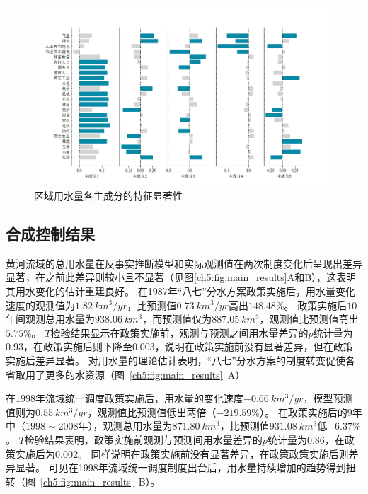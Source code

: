 \begin{figure}[htb]
    \centering
    \includegraphics[width=\textwidth]{img/ch5/ch5_variables.png}
    \caption{区域用水量各主成分的特征显著性}\label{ch5:fig:variables}
\end{figure}

\subsection{合成控制结果}\label{result-2}

黄河流域的总用水量在反事实推断模型和实际观测值在两次制度变化后呈现出差异显著，在之前此差异则较小且不显著（见图\ref{ch5:fig:main_results}A和B），这表明其用水变化的估计重建良好。
在1987年“八七”分水方案政策实施后，用水量变化速度的观测值为$1.82~km^3/yr$，比预测值$0.73~km^3/yr$高出$148.48\%$。
政策实施后$10$年间观测总用水量为$938.06~km^3$，而预测值仅为$887.05~km^3$，观测值比预测值高出$5.75\%$。
$T$检验结果显示在政策实施前，观测与预测之间用水量差异的$p$统计量为$0.93$，在政策实施后则下降至$0.003$，说明在政策实施前没有显著差异，但在政策实施后差异显著。
对用水量的理论估计表明，“八七”分水方案的制度转变促使各省取用了更多的水资源（图~\ref{ch5:fig:main_results}~A）

在$1998$年流域统一调度政策实施后，用水量的变化速度$-0.66~km^3/yr$，模型预测值则为$0.55~km^3/yr$，观测值比预测值低出两倍（$-219.59\%$）。
在政策实施后的$9$年中（$1998 \sim 2008$年），观测总用水量为$871.80~km^3$，比预测值$931.08~km^3$低$-6.37\%$。
$T$检验结果表明，政策实施前观测与预测间用水量差异的$p$统计量为$0.86$，在政策实施后为$0.002$。
同样说明在政策实施前没有显著差异，在政策政策实施后则差异显著。
可见在1998年流域统一调度制度出台后，用水量持续增加的趋势得到扭转（图~\ref{ch5:fig:main_results}~B）。

